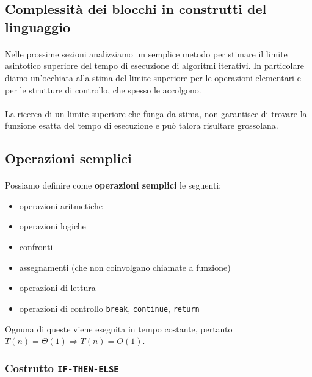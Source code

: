 \documentclass[11pt,a4paper,oneside]{article}
\begin{document}
\subsection{Complessità dei blocchi in construtti del linguaggio}
\paragraph*{}Nelle prossime sezioni analizziamo un semplice metodo per stimare il limite asintotico superiore del tempo di esecuzione di algoritmi iterativi. In particolare diamo un'occhiata alla stima del limite superiore per le operazioni elementari e per le strutture di controllo, che spesso le accolgono.\\\\La ricerca di un limite superiore che funga da stima, non garantisce di trovare la funzione esatta del tempo di esecuzione e può talora risultare grossolana.
\subsection{Operazioni semplici}
\paragraph*{}Possiamo definire come \textbf{operazioni semplici} le seguenti:
\begin{itemize}
	\item operazioni aritmetiche
	\item operazioni logiche
	\item confronti
	\item assegnamenti (che non coinvolgano chiamate a funzione)
	\item operazioni di lettura
	\item operazioni di controllo \texttt{break}, \texttt{continue}, \texttt{return}
\end{itemize}
Ognuna di queste viene eseguita in tempo costante, pertanto $T(n) = \Theta(1) \Rightarrow T(n) = O(1)$.
\subsubsection{Costrutto \texttt{IF-THEN-ELSE}}
\end{document}
